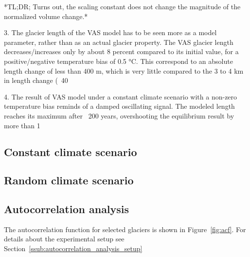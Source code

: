          *TL;DR; Turns out, the scaling constant does not change the magnitude of the normalized volume change.* 

      3. The glacier length of the VAS model has to be seen more as a model parameter, rather than as an actual glacier property. The VAS glacier length decreases/increases only by about 8 percent compared to its initial value, for a positive/negative temperature bias of 0.5 °C. This correspond to an absolute length change of less than 400 m, which is very little compared to the 3 to 4 km in length change (~40%

      4. The result of VAS model under a constant climate scenario with a non-zero temperature bias reminds of a damped oscillating signal. The modeled length reaches its maximum after ~200 years, overshooting the equilibrium result by more than 1%
    

    \subsection{Constant climate scenario} %
    \label{sub:constant_climate_scenario_results}

    

    \subsection{Random climate scenario} %
    \label{sub:random_climate_scenario_results}
    

    \subsection{Autocorrelation analysis} %
    \label{sub:autocorrelation_analysis_results}

      The autocorrelation function for selected glaciers is shown in Figure~\ref{fig:acf}. For details about the experimental setup see Section~\ref{ssub:autocorrelation_analysis_setup}

